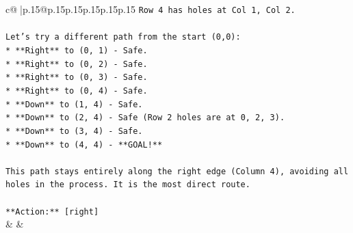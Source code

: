 \documentclass{article}
\begin{document}
{\begin{supertabular}{c@{$\;$}|p{.15\linewidth}@{}p{.15\linewidth}p{.15\linewidth}p{.15\linewidth}p{.15\linewidth}p{.15\linewidth}}
{{{\texttt{Row 4 has holes at Col 1, Col 2.} \\
\\ 
\texttt{Let's try a different path from the start (0,0):} \\
\texttt{*   **Right** to (0, 1) {-} Safe.} \\
\texttt{*   **Right** to (0, 2) {-} Safe.} \\
\texttt{*   **Right** to (0, 3) {-} Safe.} \\
\texttt{*   **Right** to (0, 4) {-} Safe.} \\
\texttt{*   **Down** to (1, 4) {-} Safe.} \\
\texttt{*   **Down** to (2, 4) {-} Safe (Row 2 holes are at 0, 2, 3).} \\
\texttt{*   **Down** to (3, 4) {-} Safe.} \\
\texttt{*   **Down** to (4, 4) {-} **GOAL!**} \\
\\ 
\texttt{This path stays entirely along the right edge (Column 4), avoiding all holes in the process. It is the most direct route.} \\
\\ 
\texttt{**Action:** {[}right{]}} \\
            }
        }
    }
    & & \\ \\


\end{supertabular}}
\end{document}
